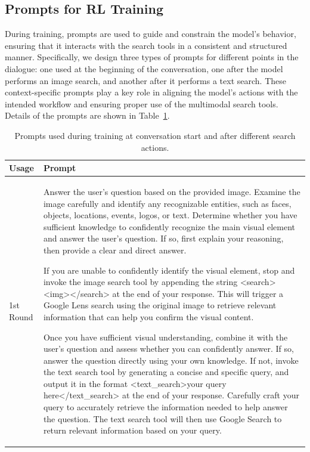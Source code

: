 \documentclass{article}
\newcommand{\search}[1]{\textcolor{search}{#1}}
\begin{document}
\subsection{Prompts for RL Training}
\label{appendix:train-prompts}
During training, prompts are used to guide and constrain the model’s behavior, ensuring that it interacts with the search tools in a consistent and structured manner. Specifically, we design three types of prompts for different points in the dialogue: one used at the beginning of the conversation, one after the model performs an image search, and another after it performs a text search. These context-specific prompts play a key role in aligning the model’s actions with the intended workflow and ensuring proper use of the multimodal search tools. Details of the prompts are shown in Table~\ref{tab:training-prompt}.
\begin{table}[H]
\centering
\caption{Prompts used during training at conversation start and after different search actions.}
\label{tab:training-prompt}
\begin{tabular}{p{1cm}|p{12cm}}
\toprule
\textbf{Usage} & \textbf{Prompt} \\ \midrule
1st Round & Answer the user's question based on the provided image. Examine the image carefully and identify any recognizable entities, such as faces, objects, locations, events, logos, or text. Determine whether you have sufficient knowledge to confidently recognize the main visual element and answer the user's question. If so, first explain your reasoning, then provide a clear and direct answer. 

If you are unable to confidently identify the visual element, stop and invoke the image search tool by appending the string \search{<search><img></search>} at the end of your response. This will trigger a Google Lens search using the original image to retrieve relevant information that can help you confirm the visual content.

Once you have sufficient visual understanding, combine it with the user's question and assess whether you can confidently answer. If so, answer the question directly using your own knowledge. If not, invoke the text search tool by generating a concise and specific query, and output it in the format \search{<text\_search>your query here</text\_search>} at the end of your response. Carefully craft your query to accurately retrieve the information needed to help answer the question. The text search tool will then use Google Search to return relevant information based on your query.


\end{tabular}
\end{table}
\end{document}
